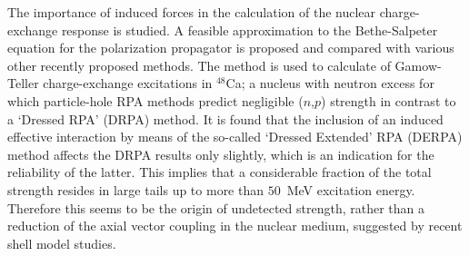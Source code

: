 \begin{WTabstract}%
The importance of induced forces in the calculation of the nuclear 
charge-exchange response is studied. A feasible approximation to the 
Bethe-Salpeter equation for the polarization propagator is proposed and 
compared with various other recently proposed methods. The method is used 
to calculate of Gamow-Teller charge-exchange excitations in $^{48}$Ca; a 
nucleus with neutron excess for which particle-hole RPA methods predict 
negligible ($n$,$p$) strength in contrast to a `Dressed RPA' (DRPA) method. 
It is 
found\cite{GAD94} that the inclusion of an induced effective interaction by
means of the so-called `Dressed Extended' RPA (DERPA) method affects the DRPA 
results only slightly, which is an indication for the reliability of the latter.
This implies that a considerable fraction of the total strength resides in 
large tails up to more than $50$~MeV excitation energy. Therefore this seems 
to be the origin of undetected strength, rather than a reduction of the axial 
vector coupling in the nuclear medium, suggested by recent shell model studies.
\end{WTabstract}
